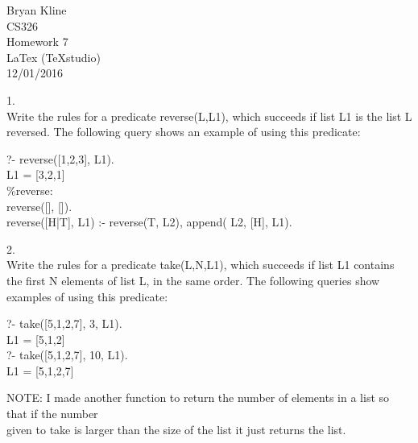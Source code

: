 \documentclass[12pt]{article}
\begin{document}
\begin{center}

\Huge
Bryan Kline\\
[10mm]
CS326\\ 
[10mm]
Homework 7\\
\small LaTex (TeXstudio)\\
[10mm]
\Huge
12/01/2016\\
[200mm]

\end{center}

\begin{flushleft}

1.\\
Write the rules for a predicate {\selectfont reverse(L,L1)}, which succeeds if list {\selectfont L1} is the list {\selectfont L} reversed. The following query shows an example of using this predicate:\\
[2mm]

{\selectfont
	
\qquad ?- reverse([1,2,3], L1).\\
\qquad L1 = [3,2,1]\\
[6mm]

\qquad \qquad \%reverse:\\
\qquad \qquad reverse([], []).\\
\qquad \qquad reverse([H|T], L1) :-  reverse(T, L2), append( L2, [H], L1).\\


}

2.\\
Write the rules for a predicate {\selectfont take(L,N,L1)}, which succeeds if list {\selectfont L1} contains the first {\selectfont N} elements of list {\selectfont L}, in the same order. The following queries show examples of using this predicate:\\
[2mm]

{\selectfont

\qquad ?- take([5,1,2,7], 3, L1).\\
\qquad L1 = [5,1,2]\\
\qquad ?- take([5,1,2,7], 10, L1).\\
\qquad L1 = [5,1,2,7]\\
[6mm]

}

	
\qquad NOTE: I made another function to return the number of elements in a list so that if the number\\
\qquad given to {\selectfont take} is larger than the size of the list it just returns the list.\\
[2mm]
{\selectfont
	
}
\end{flushleft}
\end{document}
